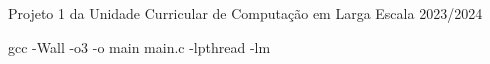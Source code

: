 Projeto 1 da Unidade Curricular de Computação em Larga Escala 2023/2024

gcc -\/Wall -\/o3 -\/o main main.\+c -\/lpthread -\/lm 